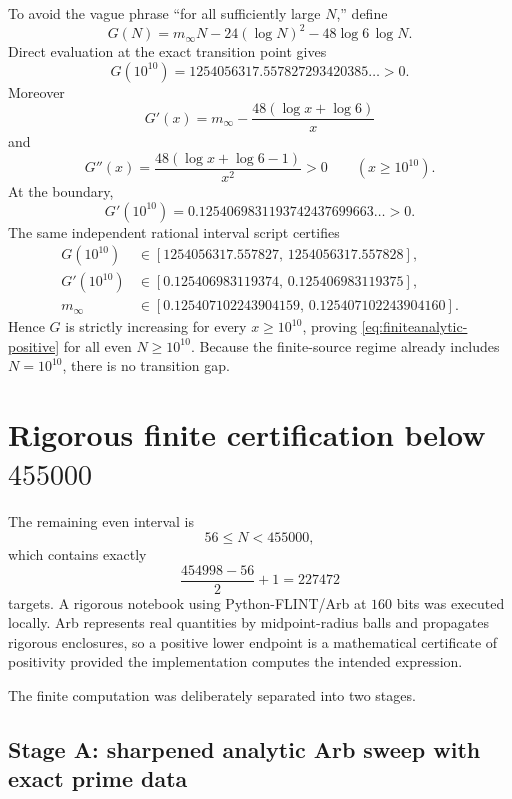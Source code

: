 \documentclass[11pt]{article}
\theoremstyle{definition}
\begin{document}
To avoid the vague phrase ``for all sufficiently large $N$,'' define
\begin{equation}\label{eq:G}
G(N)
=m_\infty N
-24(\log N)^2
-48\log6\,\log N.
\end{equation}
Direct evaluation at the exact transition point gives
\begin{equation}\label{eq:G1e10}
\boxed{
G(10^{10})
=1254056317.557827293420385\ldots>0.
}
\end{equation}
Moreover
\[
G'(x)=m_\infty-\frac{48(\log x+\log6)}{x}
\]
and
\[
G''(x)=\frac{48(\log x+\log6-1)}{x^2}>0
\qquad(x\ge10^{10}).
\]
At the boundary,
\begin{equation}\label{eq:Gp1e10}
\boxed{
G'(10^{10})
=0.1254069831193742437699663\ldots>0.
}
\end{equation}
The same independent rational interval script certifies
\begin{align}
G(10^{10})&\in[1254056317.557827,\,1254056317.557828],\label{eq:Ginterval}\\
G'(10^{10})&\in[0.125406983119374,\,0.125406983119375],\label{eq:Gpinterval}\\
m_\infty&\in[0.125407102243904159,\,0.125407102243904160].\label{eq:minfinterval}
\end{align}
Hence $G$ is strictly increasing for every $x\ge10^{10}$, proving \eqref{eq:finiteanalytic-positive} for all even $N\ge10^{10}$. Because the finite-source regime already includes $N=10^{10}$, there is no transition gap.

\section{Rigorous finite certification below $455000$}\label{sec:finitecert}

The remaining even interval is
\[
56\le N<455000,
\]
which contains exactly
\[
\frac{454998-56}{2}+1=227472
\]
targets. A rigorous notebook using Python-FLINT/Arb at $160$ bits was executed locally. Arb represents real quantities by midpoint-radius balls and propagates rigorous enclosures, so a positive lower endpoint is a mathematical certificate of positivity provided the implementation computes the intended expression.

The finite computation was deliberately separated into two stages.

\subsection{Stage A: sharpened analytic Arb sweep with exact prime data}
\end{document}
